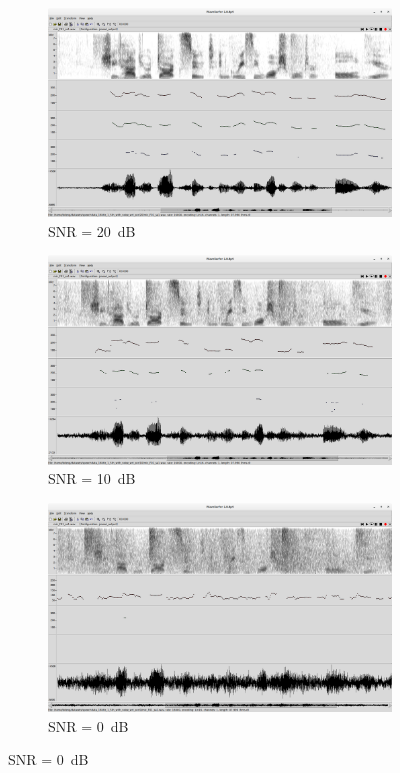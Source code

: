 \documentclass[11pt,a4paper]{report}
\begin{document}
\begin{figure}[htbp]
  \centering
  \begin{subfigure}{0.7\textwidth}
    \includegraphics[width=\textwidth]{snr_20dB.png}
    \caption{SNR = \SI{20}{dB}}
    \label{fig:snr-compare-20db}
  \end{subfigure}

  \begin{subfigure}{0.7\textwidth}
    \includegraphics[width=\textwidth]{snr_10dB.png}
    \caption{SNR = \SI{10}{dB}}
    \label{fig:snr-compare-10db}
  \end{subfigure}

  \begin{subfigure}{0.7\textwidth}
    \includegraphics[width=\textwidth]{snr_0dB.png}
    \caption{SNR = \SI{0}{dB}}
    \label{fig:snr-compare-0db}
  \end{subfigure}


\end{figure}
\end{document}
